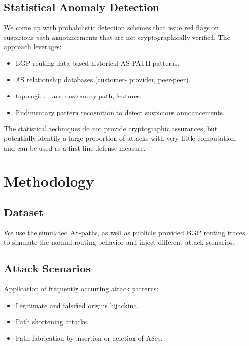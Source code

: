 \documentclass[conference]{IEEEtran}
\begin{document}
\subsection{Statistical Anomaly Detection}

We come up with probabilistic detection schemes that issue red flags on suspicious path announcements that are not cryptographically verified. The approach leverages:

\begin{itemize}
\item BGP routing data-based historical AS-PATH patterns.
\item AS relationship databases (customer- provider, peer-peer).
\item topological, and customary path, features.
\item Rudimentary pattern recognition to detect suspicious announcements.
\end{itemize}

The statistical techniques do not provide cryptographic assurances, but potentially identify a large proportion of attacks with very little computation, and can be used as a first-line defense measure.

\section{Methodology}

\subsection{Dataset}

We use the simulated AS-paths, as well as publicly provided BGP routing traces to simulate the normal routing behavior and inject different attack scenarios.

\subsection{Attack Scenarios}

Application of frequently occurring attack patterns:

\begin{itemize}
\item Legitimate and falsified origins hijacking.
\item Path shortening attacks.
\item Path fabrication by insertion or deletion of ASes.
\end{itemize}
\end{document}
